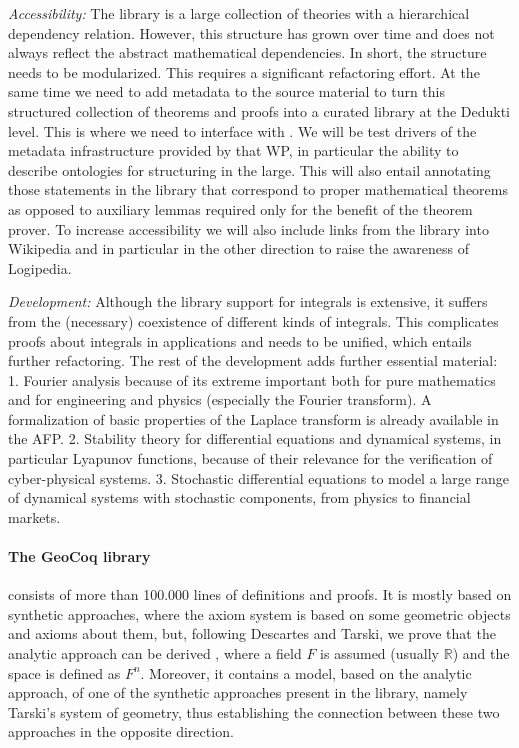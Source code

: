 \emph{Accessibility:}
The library is a large collection of theories with a hierarchical dependency
relation. However, this structure has grown over time and does not always
reflect the abstract mathematical dependencies. In short, the structure needs
to be modularized. This requires a significant refactoring effort.
%
At the same time we need to add metadata to the source material to turn this
structured collection of theorems and proofs into a curated library at the
Dedukti level.  This is where we need to interface with . We
will be test drivers of the metadata infrastructure provided by that WP, in
particular the ability to describe ontologies for structuring in the large.
This will also entail annotating those statements in the library that
correspond to proper mathematical theorems as opposed to auxiliary lemmas
required only for the benefit of the theorem prover.
To increase accessibility we will also include links from the library into
Wikipedia and in particular in the other direction to raise the awareness
of Logipedia.

\emph{Development:}
Although the library support for integrals is extensive, it suffers
from the (necessary) coexistence of different kinds of
integrals. This complicates proofs about integrals in applications and needs
to be unified, which entails further refactoring. The rest of the
development adds further essential material:
1. Fourier analysis because of its extreme important both for pure mathematics and for
engineering and physics (especially the Fourier
transform). A formalization of basic properties of the Laplace transform is already available in the AFP. 2. Stability theory for differential equations and
dynamical systems, in particular Lyapunov functions, because of their
relevance for the verification of cyber-physical systems.
3. Stochastic differential equations to model a large range of
dynamical systems with stochastic components, from physics to financial markets.

\paragraph*{The GeoCoq library}
consists of more than 100.000 lines of definitions and proofs. It is
mostly based on synthetic approaches, where the axiom system is based
on some geometric objects and axioms about them, but, following
Descartes and Tarski, we prove that the analytic approach can be
derived , where a field $F$ is assumed (usually $\mathbb{R}$) and the space is
defined as $F^n$. Moreover, it contains a model, based on the analytic
approach, of one of the synthetic approaches present in the library,
namely Tarski's system of geometry, thus establishing the connection
between these two approaches in the opposite direction.

